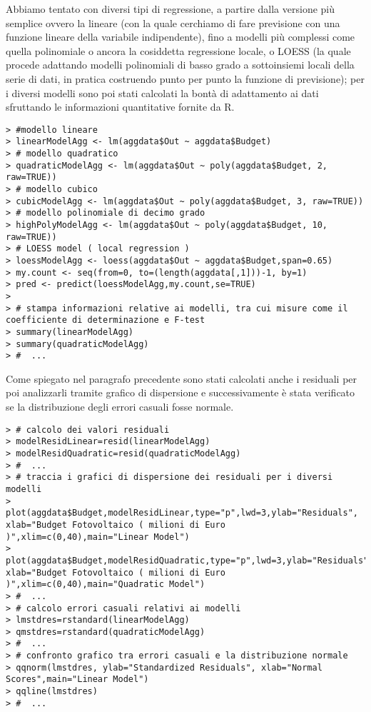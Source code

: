\documentclass[12pt,a4paper,openright,twoside]{report}
\begin{document}
Abbiamo tentato con diversi tipi di regressione, a partire dalla versione più semplice ovvero la lineare \cite{robustLinearRegression}(con la quale cerchiamo di fare previsione con una funzione lineare della variabile indipendente), fino a modelli più complessi come quella polinomiale \cite{Gergonne1974439,Stigler1974431} o ancora la cosiddetta regressione locale, o LOESS \cite{lowess}(la quale procede adattando modelli polinomiali di basso grado a sottoinsiemi locali della serie di dati, in pratica costruendo punto per punto la funzione di previsione); per i diversi modelli sono poi stati calcolati la bontà di adattamento ai dati sfruttando le informazioni quantitative fornite da R.

\begin{lstlisting}
> #modello lineare
> linearModelAgg <- lm(aggdata$Out ~ aggdata$Budget)
> # modello quadratico
> quadraticModelAgg <- lm(aggdata$Out ~ poly(aggdata$Budget, 2, raw=TRUE))
> # modello cubico
> cubicModelAgg <- lm(aggdata$Out ~ poly(aggdata$Budget, 3, raw=TRUE))
> # modello polinomiale di decimo grado
> highPolyModelAgg <- lm(aggdata$Out ~ poly(aggdata$Budget, 10, raw=TRUE))
> # LOESS model ( local regression )
> loessModelAgg <- loess(aggdata$Out ~ aggdata$Budget,span=0.65)
> my.count <- seq(from=0, to=(length(aggdata[,1]))-1, by=1)
> pred <- predict(loessModelAgg,my.count,se=TRUE)
>
> # stampa informazioni relative ai modelli, tra cui misure come il coefficiente di determinazione e F-test
> summary(linearModelAgg)
> summary(quadraticModelAgg)
> #  ... 
\end{lstlisting}

Come spiegato nel paragrafo precedente sono stati calcolati anche i residuali per poi analizzarli tramite grafico di dispersione e successivamente è stata verificato se la distribuzione degli errori casuali fosse normale.

\begin{lstlisting}
> # calcolo dei valori residuali
> modelResidLinear=resid(linearModelAgg)
> modelResidQuadratic=resid(quadraticModelAgg)
> #  ...
> # traccia i grafici di dispersione dei residuali per i diversi modelli
> plot(aggdata$Budget,modelResidLinear,type="p",lwd=3,ylab="Residuals", xlab="Budget Fotovoltaico ( milioni di Euro )",xlim=c(0,40),main="Linear Model") 
> plot(aggdata$Budget,modelResidQuadratic,type="p",lwd=3,ylab="Residuals", xlab="Budget Fotovoltaico ( milioni di Euro )",xlim=c(0,40),main="Quadratic Model") 
> #  ...
> # calcolo errori casuali relativi ai modelli
> lmstdres=rstandard(linearModelAgg)
> qmstdres=rstandard(quadraticModelAgg)
> #  ...
> # confronto grafico tra errori casuali e la distribuzione normale
> qqnorm(lmstdres, ylab="Standardized Residuals", xlab="Normal Scores",main="Linear Model") 
> qqline(lmstdres)
> #  ...
\end{lstlisting}
\end{document}
